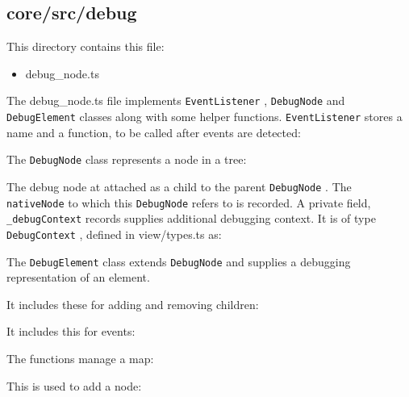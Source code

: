 \subsection{core/src/debug}

This directory contains this file:

\begin{itemize}
  \item debug\_node.ts
\end{itemize}

The debug\_node.ts file implements
\texttt{EventListener}
,
\texttt{DebugNode}
and
\texttt{DebugElement}
classes along with some helper functions.
\texttt{EventListener}
stores a name and a
function, to be called after events are detected:



The
\texttt{DebugNode}
class represents a node in a tree:



The debug node at attached as a child to the parent
\texttt{DebugNode}
. The
\texttt{nativeNode}
to
which this
\texttt{DebugNode}
refers to is recorded. A private field,
\texttt{\_debugContext}
records
supplies additional debugging context. It is of type
\texttt{DebugContext}
, defined in
view/types.ts as:



The
\texttt{DebugElement}
class extends
\texttt{DebugNode}
and supplies a debugging representation
of an element.



It includes these for adding and removing children:



It includes this for events:



The functions manage a map:



This is used to add a node:


